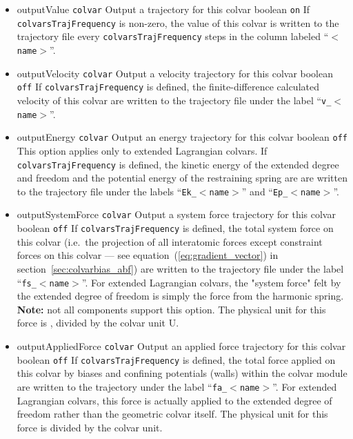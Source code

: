 \begin{itemize}
\item %
  \keydef
    {outputValue}{%
    \texttt{colvar}}{%
    Output a trajectory for this colvar}{%
    boolean}{%
    \texttt{on}}{%
    If \texttt{colvarsTrajFrequency} is non-zero, the value of this
    colvar is written to the trajectory file every
    \texttt{colvarsTrajFrequency} steps in the column labeled
    ``$<$\texttt{name}$>$''.}

\item %
  \keydef
    {outputVelocity}{%
    \texttt{colvar}}{%
    Output a velocity trajectory for this colvar}{%
    boolean}{%
    \texttt{off}}{%
    If \texttt{colvarsTrajFrequency} is defined, the
    finite-difference calculated velocity of this colvar are written
    to the trajectory file under the label
    ``\texttt{v\_}$<$\texttt{name}$>$''.}

\item %
  \keydef
    {outputEnergy}{%
    \texttt{colvar}}{%
    Output an energy trajectory for this colvar}{%
    boolean}{%
    \texttt{off}}{%
    This option applies only to extended Lagrangian colvars. If
    \texttt{colvarsTrajFrequency} is defined, the kinetic energy of
    the extended degree and freedom and the potential energy of the
    restraining spring are are written to the trajectory file under
    the labels ``\texttt{Ek\_}$<$\texttt{name}$>$'' and
    ``\texttt{Ep\_}$<$\texttt{name}$>$''.}

\item %
  \keydef
    {outputSystemForce}{%
    \texttt{colvar}}{%
    Output a system force trajectory for this
    colvar}{%
    boolean}{%
    \texttt{off}}{%
    If \texttt{colvarsTrajFrequency} is defined, the total system force on this
    colvar (i.e.~the projection of all interatomic forces
    except constraint forces on this colvar --- see
    equation~(\ref{eq:gradient_vector}) in
    section~\ref{sec:colvarbias_abf}) are written to the trajectory
    file under the label ``\texttt{fs\_}$<$\texttt{name}$>$''.
    For extended Lagrangian colvars, the "system force" felt by the extended degree of freedom
    is simply the force from the harmonic spring.
    \textbf{Note:} not all components support this option.  The
    physical unit for this force is , divided by the colvar unit U.}

\item %
  \keydef
    {outputAppliedForce}{%
    \texttt{colvar}}{%
    Output an applied force trajectory for this
    colvar}{%
    boolean}{%
    \texttt{off}}{%
    If \texttt{colvarsTrajFrequency} is defined, the total force
    applied on this colvar by biases and confining potentials (walls)
    within the colvar module are
    written to the trajectory under the label
    ``\texttt{fa\_}$<$\texttt{name}$>$''. 
    For extended Lagrangian colvars, this force is actually applied to the
    extended degree of freedom rather than the geometric colvar itself.
    The physical unit for this
    force is  divided by the colvar unit.}
\end{itemize}



